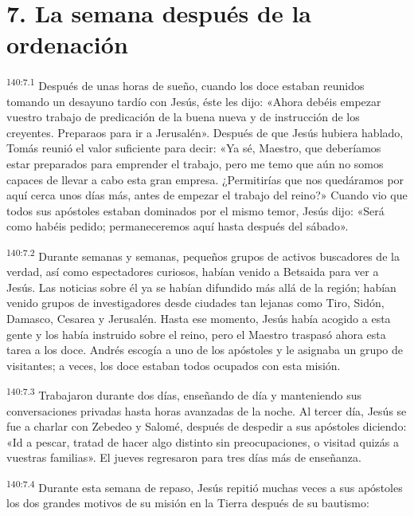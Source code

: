 \section*{7. La semana después de la ordenación}
\par 
\textsuperscript{140:7.1} Después de unas horas de sueño, cuando los doce estaban reunidos tomando un desayuno tardío con Jesús, éste les dijo: «Ahora debéis empezar vuestro trabajo de predicación de la buena nueva y de instrucción de los creyentes. Preparaos para ir a Jerusalén». Después de que Jesús hubiera hablado, Tomás reunió el valor suficiente para decir: «Ya sé, Maestro, que deberíamos estar preparados para emprender el trabajo, pero me temo que aún no somos capaces de llevar a cabo esta gran empresa. ¿Permitirías que nos quedáramos por aquí cerca unos días más, antes de empezar el trabajo del reino?» Cuando vio que todos sus apóstoles estaban dominados por el mismo temor, Jesús dijo: «Será como habéis pedido; permaneceremos aquí hasta después del sábado».

\par 
\textsuperscript{140:7.2} Durante semanas y semanas, pequeños grupos de activos buscadores de la verdad, así como espectadores curiosos, habían venido a Betsaida para ver a Jesús. Las noticias sobre él ya se habían difundido más allá de la región; habían venido grupos de investigadores desde ciudades tan lejanas como Tiro, Sidón, Damasco, Cesarea y Jerusalén. Hasta ese momento, Jesús había acogido a esta gente y los había instruido sobre el reino, pero el Maestro traspasó ahora esta tarea a los doce. Andrés escogía a uno de los apóstoles y le asignaba un grupo de visitantes; a veces, los doce estaban todos ocupados con esta misión.

\par 
\textsuperscript{140:7.3} Trabajaron durante dos días, enseñando de día y manteniendo sus conversaciones privadas hasta horas avanzadas de la noche. Al tercer día, Jesús se fue a charlar con Zebedeo y Salomé, después de despedir a sus apóstoles diciendo: «Id a pescar, tratad de hacer algo distinto sin preocupaciones, o visitad quizás a vuestras familias». El jueves regresaron para tres días más de enseñanza.

\par 
\textsuperscript{140:7.4} Durante esta semana de repaso, Jesús repitió muchas veces a sus apóstoles los dos grandes motivos de su misión en la Tierra después de su bautismo:

